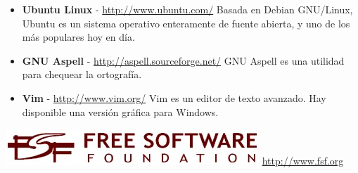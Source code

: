 \begin{flushleft}
\begin{itemize}
\item \textbf{Ubuntu Linux} - \href{http://www.ubuntu.com/}
  {http://www.ubuntu.com/}
\linebreak Basada en Debian GNU/Linux, Ubuntu es un sistema operativo
enteramente de fuente abierta, y uno de los más populares hoy en día.

\item \textbf{GNU Aspell} - \href{http://aspell.sourceforge.net//}
  {http://aspell.sourceforge.net/}
\linebreak GNU Aspell es una utilidad para chequear la ortografía.

\item \textbf{Vim} - \href{http://www.vim.org/}
  {http://www.vim.org/}
\linebreak Vim es un editor de texto avanzado. Hay disponible una
versión gráfica para Windows.

\end{itemize}
\end{flushleft}

\begin{center}
\includegraphics[scale=0.50]{logofsf.jpg}
\linebreak\href{http://www.fsf.org}{http://www.fsf.org}
\end{center}
